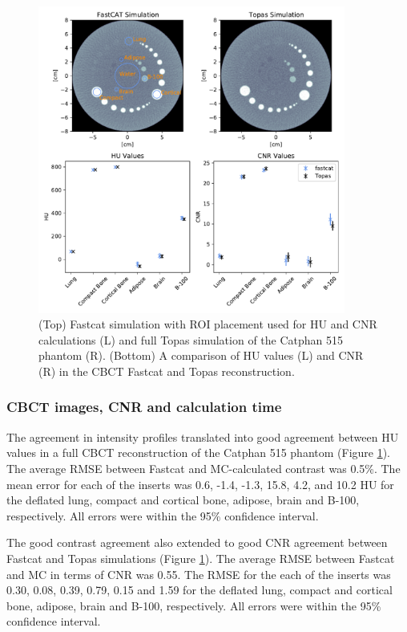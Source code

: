 \begin{figure}[ht!]
   \begin{center}
   \includegraphics[width=0.9\textwidth]{figures/contrast_4_panel.pdf}
   \caption{
   (Top) Fastcat simulation with ROI placement used for HU and CNR calculations (L) and full Topas simulation of the Catphan 515 phantom (R). (Bottom) A comparison of HU values (L) and CNR (R) in the CBCT Fastcat and Topas reconstruction.
   \label{recon_comparison} 
    }  %
    \end{center}
\end{figure}

\subsubsection{CBCT images, CNR and calculation time}

The agreement in intensity profiles translated into good agreement between HU values in a full CBCT reconstruction of the Catphan 515 phantom (Figure \ref{recon_comparison}). The average RMSE between Fastcat and MC-calculated contrast was 0.5\%. The mean error for each of the inserts was 0.6, -1.4, -1.3, 15.8, 4.2, and 10.2 HU for the deflated lung, compact and cortical bone, adipose, brain and B-100, respectively. All errors were within the 95\% confidence interval.


The good contrast agreement also extended to good CNR agreement between Fastcat and Topas simulations (Figure \ref{recon_comparison}). The average RMSE between Fastcat and MC in terms of CNR was 0.55. The RMSE for the each of the inserts was 0.30, 0.08, 0.39, 0.79, 0.15 and 1.59 for the deflated lung, compact and cortical bone, adipose, brain and B-100, respectively. All errors were within the 95\% confidence interval.

